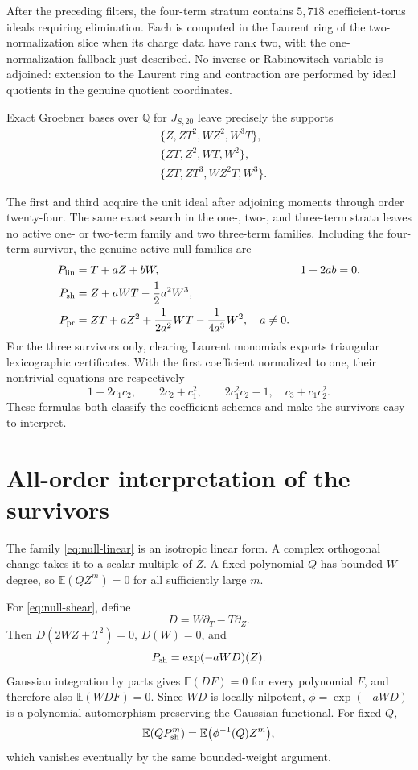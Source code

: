\documentclass[11pt]{article}
\newcommand{\E}{\mathbb E}
\begin{document}
After the preceding filters, the four-term stratum contains \(5{,}718\)
coefficient-torus ideals requiring elimination.  Each is computed in the
Laurent ring of the two-normalization slice when its charge data have rank
two, with the one-normalization fallback just described.  No inverse or
Rabinowitsch variable is adjoined: extension to the Laurent ring and
contraction are performed by ideal quotients in the genuine quotient
coordinates.
\begin{samepage}
Exact Groebner bases over \(\mathbb Q\) for \(J_{S,20}\) leave precisely
the supports
\[
\begin{split}
 &\{Z,ZT^2,WZ^2,W^3T\},\\
 &\{ZT,Z^2,WT,W^2\},\\
 &\{ZT,ZT^3,WZ^2T,W^3\}.
\end{split}
\]
\end{samepage}
The first and third acquire the unit ideal after adjoining moments through
order twenty-four.  The same exact search in the one-, two-, and three-term
strata leaves no active one- or two-term family and two three-term
families.  Including the four-term survivor, the genuine active null
families are
\begin{align}
 P_{\rm lin}&=T+aZ+bW,&1+2ab&=0,                 \label{eq:null-linear}\\
 P_{\rm sh}&=Z+aWT-\frac12a^2W^3,                \label{eq:null-shear}\\
 P_{\rm pr}&=ZT+aZ^2+\frac1{2a^2}WT
                    -\frac1{4a^3}W^2,\quad a\neq0. \label{eq:null-product}
\end{align}
For the three survivors only, clearing Laurent monomials exports triangular
lexicographic certificates.  With the first coefficient normalized to one,
their nontrivial equations are respectively
\[
 1+2c_1c_2,\qquad
 2c_2+c_1^2,\qquad
 2c_1^2c_2-1,\quad c_3+c_1c_2^2.
\]
These formulas both classify the coefficient schemes and make the
survivors easy to interpret.

\section{All-order interpretation of the survivors}

The family \eqref{eq:null-linear} is an isotropic linear form.  A complex
orthogonal change takes it to a scalar multiple of \(Z\).  A fixed
polynomial \(Q\) has bounded \(W\)-degree, so
\(\E(QZ^m)=0\) for all sufficiently large \(m\).

For \eqref{eq:null-shear}, define
\[
 D=W\partial_T-T\partial_Z.
\]
Then \(D(2WZ+T^2)=0\), \(D(W)=0\), and
\[
 P_{\rm sh}=\exp(-aWD)(Z).
\]
Gaussian integration by parts gives \(\E(DF)=0\) for every polynomial
\(F\), and therefore also \(\E(WDF)=0\).  Since \(WD\) is locally nilpotent,
\(\phi=\exp(-aWD)\) is a polynomial automorphism preserving the Gaussian
functional.  For fixed \(Q\),
\[
 \E(QP_{\rm sh}^m)
 =\E\bigl(\phi^{-1}(Q)Z^m\bigr),
\]
which vanishes eventually by the same bounded-weight argument.
\end{document}
